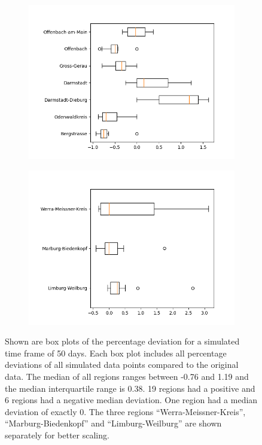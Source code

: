 \begin{figure}
\begin{subfigure}[b]{0.4\textwidth}
		\includegraphics[width=\textwidth]{./figures/50d/deviation_box50_alt3.png}	
	\end{subfigure}
	\begin{subfigure}[b]{0.4\textwidth}
		\centering
		\includegraphics[width=\textwidth]{./figures/50d/deviation_box50_alt4.png}	
	\end{subfigure}
	\caption{Shown are box plots of the percentage deviation for a simulated time frame of 50 days. Each box plot includes
		all percentage deviations of all simulated data points compared to the original data. The median of all regions
		ranges between -0.76 and 1.19 and the median interquartile range is 0.38. 19 regions had a positive and
		6 regions had a negative median deviation. One region had a median deviation of exactly 0.
		The three regions ``Werra-Meissner-Kreis'', ``Marburg-Biedenkopf'' and ``Limburg-Weilburg'' are shown
		separately for better scaling.
		}
	\label{fig:50_sim_box}
\end{figure}

